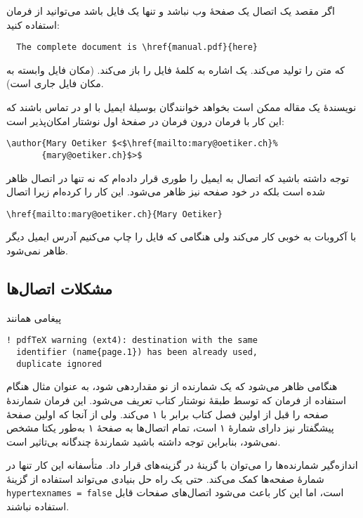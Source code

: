 اگر مقصد یک اتصال یک صفحهٔ وب نباشد و تنها یک فایل باشد می‌توانید از فرمان   استفاده کنید: 

\setLR
\begin{verbatim}
  The complete document is \href{manual.pdf}{here}
\end{verbatim}
\setRL

که متن 
 را تولید می‌کند.
یک اشاره به کلمهٔ 
  فایل   را باز می‌کند. 
(مکان فایل وابسته به مکان فایل جاری است).

نویسندهٔ یک مقاله ممکن است بخواهد خوانندگان بوسیلهٔ ایمیل با او در تماس باشند که این کار با فرمان  درون فرمان  در صفحهٔ اول نوشتار‌ امکان‌پذیر است:

\setLR
\begin{code}
\begin{verbatim}
\author{Mary Oetiker $<$\href{mailto:mary@oetiker.ch}%
       {mary@oetiker.ch}$>$
\end{verbatim}
\end{code}
\setRL

توجه داشته باشید که اتصال به ایمیل را طوری قرار داده‌ام که نه تنها در اتصال ظاهر شده است بلکه در خود صفحه نیز ظاهر می‌شود. این کار را کرده‌ام زیرا اتصال

\setLR
\verb+\href{mailto:mary@oetiker.ch}{Mary Oetiker}+\\
\setRL

با آکروبات به خوبی کار می‌کند ولی هنگامی که فایل را چاپ می‌کنیم آدرس ایمیل دیگر ظاهر نمی‌شود.

\subsection{مشکلات اتصال‌ها}
پیغامی همانند 

\setLR
\begin{verbatim}
! pdfTeX warning (ext4): destination with the same
  identifier (name{page.1}) has been already used,
  duplicate ignored
\end{verbatim}
\setRL

هنگامی ظاهر می‌شود که یک شمارنده از نو مقداردهی شود، به عنوان مثال هنگام استفاده از فرمان   که توسط طبقهٔ نوشتار کتاب تعریف می‌شود. این فرمان شمارندهٔ صفحه را قبل از اولین فصل کتاب برابر با ۱ می‌کند. ولی از آنجا که اولین صفحهٔ پیشگفتار نیز دارای شمارهٔ ۱ است، تمام اتصال‌ها به صفحهٔ ۱ به‌طور یکتا مشخص نمی‌شود،   بنابراین توجه داشته باشید شمارندهٔ چندگانه بی‌تاثیر است.

اندازه‌گیر شمارنده‌ها را می‌توان با گزینهٔ  در گزینه‌های  قرار داد. متأسفانه این کار تنها در شمارهٔ صفحه‌ها کمک می‌کند.
حتی یک راه حل بنیادی می‌تواند استفاده از گزینهٔ \texttt{hypertexnames = false} است، اما این کار باعث می‌شود اتصال‌های صفحات قابل استفاده نباشند.

